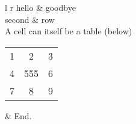\documentclass{article}
\begin{document}
\begin{tabular}{l r}
	hello & goodbye \\
	second & row \\
	\hline
	 {
		A cell can itself be a table (below)
	} \\
	\hline
	\begin{tabular}{c c c}
		1 & 2 & 3 \\
		4 & 555 & 6 \\
		7 & 8 & 9 \\
	\end{tabular} &
	End. \\
\end{tabular}
\end{document}
